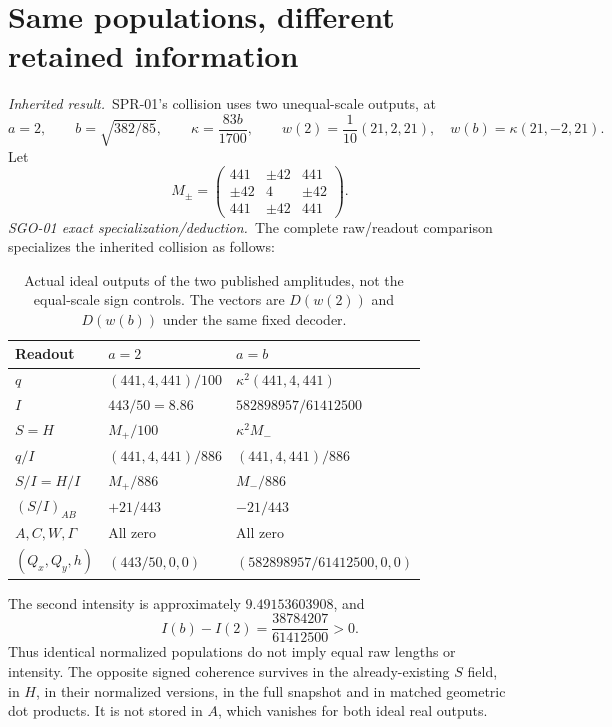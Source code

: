 \documentclass[11pt,a4paper]{article}
\newcommand{\inherited}{\textit{Inherited result.}}
\newcommand{\deduction}{\textit{SGO-01 exact specialization/deduction.}}
\begin{document}
\section{Same populations, different retained information}\label{sec:pair}
\inherited\ SPR-01's collision uses two unequal-scale outputs, at
\begin{equation}
a=2,\qquad b=\sqrt{382/85},\qquad \kappa=\frac{83b}{1700},\qquad
w(2)=\frac1{10}(21,2,21),\quad w(b)=\kappa(21,-2,21).\label{eq:pair}
\end{equation}
Let
\begin{equation}
M_\pm=\begin{pmatrix}441&\pm42&441\\\pm42&4&\pm42\\441&\pm42&441\end{pmatrix}.
\label{eq:Mpm}
\end{equation}
\deduction\ The complete raw/readout comparison specializes the inherited collision as follows:
\begin{table}[htbp]\centering
\renewcommand{\arraystretch}{1.3}
\begin{tabular}{lll}\toprule
Readout & $a=2$ & $a=b$\\\midrule
$q$ & $(441,4,441)/100$ & $\kappa^2(441,4,441)$\\
$I$ & $443/50=8.86$ & $582898957/61412500$\\
$S=H$ & $M_+/100$ & $\kappa^2M_-$\\
$q/I$ & $(441,4,441)/886$ & $(441,4,441)/886$\\
$S/I=H/I$ & $M_+/886$ & $M_-/886$\\
$(S/I)_{AB}$ & $+21/443$ & $-21/443$\\
$A,C,W,\Gamma$ & All zero & All zero\\
$(Q_x,Q_y,h)$ & $(443/50,0,0)$ & $(582898957/61412500,0,0)$\\\bottomrule
\end{tabular}
\caption{Actual ideal outputs of the two published amplitudes, not the equal-scale sign controls. The vectors are $D(w(2))$ and $D(w(b))$ under the same fixed decoder.}
\label{tab:pair}
\end{table}

The second intensity is approximately $9.49153603908$, and
\begin{equation}
I(b)-I(2)=\frac{38784207}{61412500}>0.\label{eq:intensitygap}
\end{equation}
Thus identical normalized populations do not imply equal raw lengths or intensity. The opposite signed coherence survives in the already-existing $S$ field, in $H$, in their normalized versions, in the full snapshot and in matched geometric dot products. It is not stored in $A$, which vanishes for both ideal real outputs.
\end{document}
